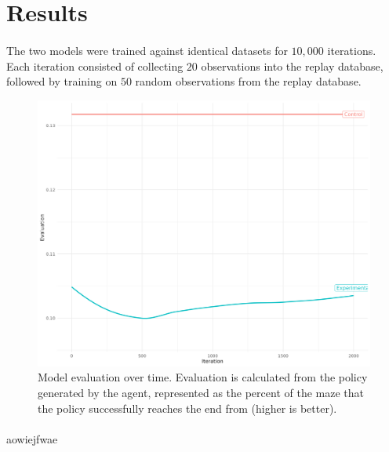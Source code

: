 \documentclass[12pt]{article}
\begin{document}




\newpage


\section{Results}

\paragraph{} The two models were trained against identical datasets for $10,000$ iterations. Each iteration consisted of collecting $20$ observations into the replay database, followed by training on $50$ random observations from the replay database.

\begin{figure}[h]
    \includegraphics[width=\linewidth]{graph.png}
    \caption{Model evaluation over time. Evaluation is calculated from the policy generated by the agent, represented as the percent of the maze that the policy successfully reaches the end from (higher is better).}
\end{figure}



\paragraph{} aowiejfwae

\newpage


\end{document}
